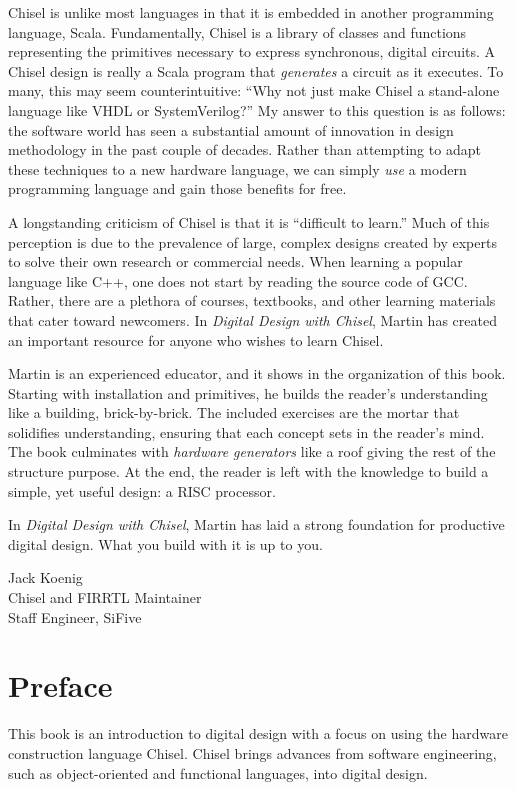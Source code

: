 \documentclass[%
    10pt,
    headinclude, footexclude,
    openright, %
    notitlepage,
    cleardoubleempty,
    headsepline,
    pointlessnumbers,
    bibtotoc, idxtotoc,
    ]{scrbook}
\begin{document}
Chisel is unlike most languages in that it is embedded in another programming language, Scala. Fundamentally, Chisel is a library of classes and functions representing the primitives necessary to express synchronous, digital circuits. A Chisel design is really a Scala program that \emph{generates} a circuit as it executes. To many, this may seem counterintuitive: ``Why not just make Chisel a stand-alone language like VHDL or SystemVerilog?'' My answer to this question is as follows: the software world has seen a substantial amount of innovation in design methodology in the past couple of decades. Rather than attempting to adapt these techniques to a new hardware language, we can simply \emph{use} a modern programming language and gain those benefits for free.

A longstanding criticism of Chisel is that it is ``difficult to learn.'' Much of this perception is due to the prevalence of large, complex designs created by experts to solve their own research or commercial needs. When learning a popular language like C++, one does not start by reading the source code of GCC. Rather, there are a plethora of courses, textbooks, and other learning materials that cater toward newcomers. In \emph{Digital Design with Chisel}, Martin has created an important resource for anyone who wishes to learn Chisel.

Martin is an experienced educator, and it shows in the organization of this book. Starting with installation and primitives, he builds the reader's understanding like a building, brick-by-brick. The included exercises are the mortar that solidifies understanding, ensuring that each concept sets in the reader's mind. The book culminates with \emph{hardware generators} like a roof giving the rest of the structure purpose. At the end, the reader is left with the knowledge to build a simple, yet useful design: a RISC processor.

In \emph{Digital Design with Chisel}, Martin has laid a strong foundation for productive digital design. What you build with it is up to you.

\medskip
\noindent Jack Koenig\\
Chisel and FIRRTL Maintainer\\
Staff Engineer, SiFive


\chapter{Preface}

This book is an introduction to digital design with a focus on using the hardware construction language Chisel. Chisel brings advances from software engineering, such as object-oriented and functional languages, into digital design.
\end{document}
